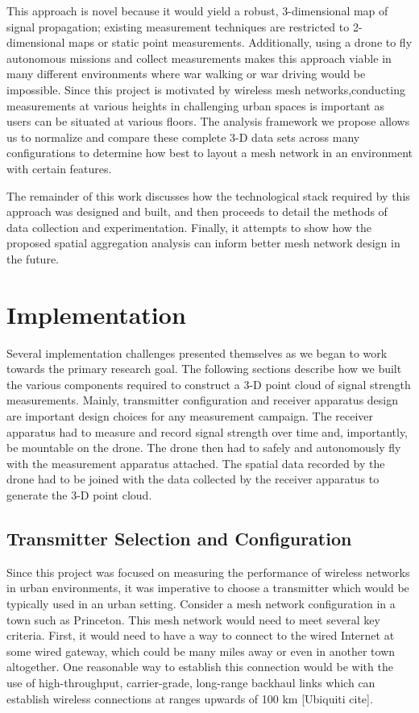 \documentclass[pageno]{jpaper}
\begin{document}
This approach is novel because it would yield a robust, 3-dimensional map of signal propagation; existing measurement techniques are restricted to 2-dimensional maps or static point measurements. Additionally, using a drone to fly autonomous missions and collect measurements makes this approach viable in many different environments where war walking or war driving would be impossible. Since this project is motivated by wireless mesh networks,conducting measurements at various heights in challenging urban spaces is important as users can be situated at various floors. 
The analysis framework we propose allows us to normalize and compare these complete 3-D data sets across many configurations to determine how best to layout a mesh network in an environment with certain features.

The remainder of this work discusses how the technological stack required by this approach was designed and built, and then proceeds to detail the methods of data collection and experimentation. Finally, it attempts to show how the proposed spatial aggregation analysis can inform better mesh network design in the future.

\section{Implementation}
Several implementation challenges presented themselves as we began to work towards the primary research goal. The following sections describe how we built the various components required to construct a 3-D point cloud of signal strength measurements. Mainly, transmitter configuration and receiver apparatus design are  important design choices for any measurement campaign. The receiver apparatus had to measure and record signal strength over time and, importantly, be mountable on the drone. The drone then had to safely and autonomously fly with the measurement apparatus attached. The spatial data recorded by the drone had to be joined with the data collected by the receiver apparatus to generate the 3-D point cloud.

\subsection{Transmitter Selection and Configuration}
Since this project was focused on measuring the performance of wireless networks in urban environments, it was imperative to choose a transmitter which would be typically used in an urban setting. Consider a mesh network configuration in a town such as Princeton. This mesh network would need to meet several key criteria. First, it would need to have a way to connect to the wired Internet at some wired gateway, which could be many miles away or even in another town altogether. One reasonable way to establish this connection would be with the use of high-throughput, carrier-grade, long-range backhaul links which can establish wireless connections at ranges upwards of 100 km [Ubiquiti cite].
\end{document}
